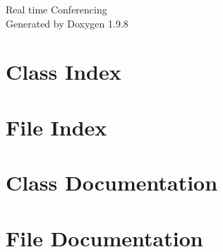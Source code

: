 \documentclass[twoside]{book}
\newcommand{\+}{\discretionary{\mbox{\scriptsize$\hookleftarrow$}}{}{}}
\newcommand{\clearemptydoublepage}{%
    \newpage{\pagestyle{empty}\cleardoublepage}%
  }
\begin{document}
  \raggedbottom
    \hypersetup{pageanchor=false,
                bookmarksnumbered=true,
                pdfencoding=unicode
               }
  \begin{titlepage}
  \vspace*{7cm}
  \begin{center}%
  {\Large Real time Conferencing}\\
  \vspace*{1cm}
  {\large Generated by Doxygen 1.9.8}\\
  \end{center}
  \end{titlepage}
  \clearemptydoublepage
  \tableofcontents
  \clearemptydoublepage
  \hypersetup{pageanchor=true}
\chapter{Class Index}

\chapter{File Index}

\chapter{Class Documentation}





















\chapter{File Documentation}

















  \backmatter
  \newpage
  \clearemptydoublepage
  \printindex
\end{document}
